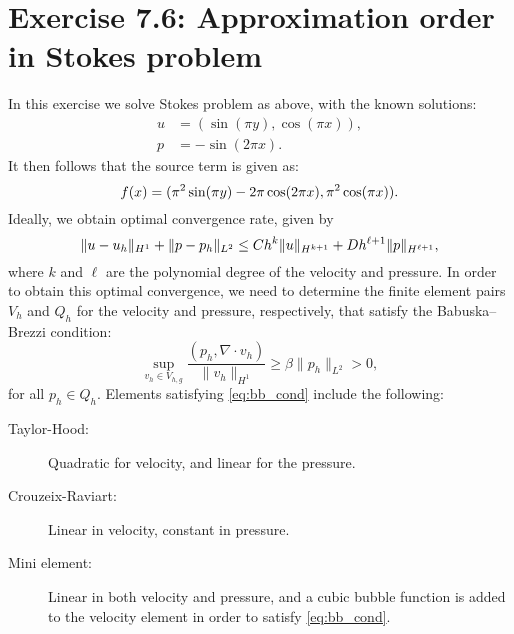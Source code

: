 \documentclass[twocolumn, article]{memoir}
\begin{document}
\chapter*{Exercise 7.6: Approximation order in Stokes problem}
\label{cha:exercise_7_6_approximation_order_in_poiseuille_flow}

In this exercise we solve Stokes problem as above, with the known solutions:
\begin{align*}
    u &= (\sin(\pi y), \cos(\pi x)), \\
    p &= -\sin(2 \pi x).
\end{align*}
It then follows that the source term is given as:
\begin{equation}
    \notag
    f(x) = (\pi^2 \sin(\pi y) - 2 \pi \cos(2 \pi x), \pi^2 \cos(\pi x)).
\end{equation}
Ideally, we obtain optimal convergence rate, given by
\begin{equation}
    \notag
    \|u - u_h\|_{H^1} + \| p - p_h\|_{L^2} \leq Ch^k\|u\|_{H^{k+1}} + Dh^{\ell + 1} \| p \|_{H^{\ell + 1}},
\end{equation}
where \( k \) and \( \ell \) are the polynomial degree of the velocity and
pressure.  In order to obtain this optimal convergence, we need to determine
the finite element pairs \( V_h \) and \( Q_h\) for the velocity and pressure,
respectively, that satisfy the Babuska--Brezzi condition:
\begin{equation}
    \label{eq:bb_cond}
    \sup_{v_h \in V_{h, g}} \frac{(p_h, \nabla \cdot v_h)}{\|v_h\|_{H^1}} \geq \beta
    \|p_h\|_{L^{2}} > 0, 
\end{equation}
for all \(p_h \in Q_h\).
Elements satisfying \cref{eq:bb_cond} include the following:
\begin{description}
    \item[Taylor-Hood:]
        Quadratic for velocity, and linear for the pressure.
    \item[Crouzeix-Raviart:]
        Linear in velocity, constant in pressure.
    \item[Mini element:]
        Linear in both velocity and pressure, and a cubic bubble function is
        added to the velocity element in order to satisfy \cref{eq:bb_cond}.
\end{description}
\end{document}
